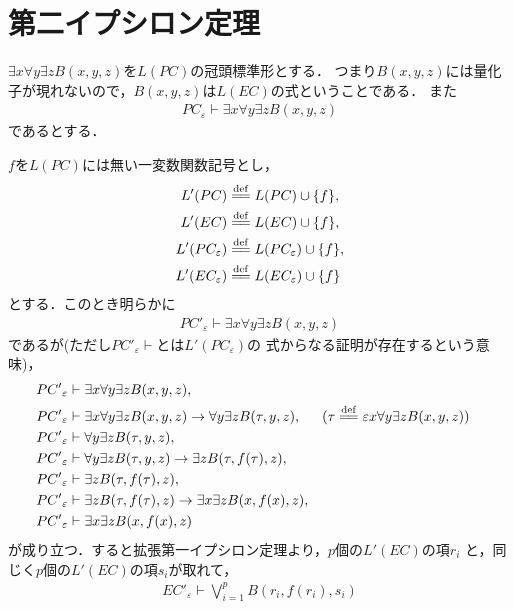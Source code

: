 \section{第二イプシロン定理}
	$\exists x \forall y \exists z B(x,y,z)$を$L(PC)$の冠頭標準形とする．
	つまり$B(x,y,z)$には量化子が現れないので，$B(x,y,z)$は$L(EC)$の式ということである．
	また
	\begin{align}
		PC_{\varepsilon} \vdash \exists x \forall y \exists z B(x,y,z)
	\end{align}
	であるとする．
	
	$f$を$L(PC)$には無い一変数関数記号とし，
	\begin{align}
		L'(PC) &\defeq L(PC) \cup \{f\}, \\
		L'(EC) &\defeq L(EC) \cup \{f\}, \\
		L'(PC_{\varepsilon}) &\defeq L(PC_{\varepsilon}) \cup \{f\}, \\
		L'(EC_{\varepsilon}) &\defeq L(EC_{\varepsilon}) \cup \{f\}
	\end{align}
	とする．このとき明らかに
	\begin{align}
		{PC'}_{\varepsilon} \vdash \exists x \forall y \exists z B(x,y,z)
	\end{align}
	であるが(ただし${PC'}_{\varepsilon} \vdash$とは$L'(PC_{\varepsilon})$の
	式からなる証明が存在するという意味)，
	\begin{align}
		{PC'}_{\varepsilon} &\vdash \exists x \forall y \exists z B(x,y,z), \\
		{PC'}_{\varepsilon} &\vdash \exists x \forall y \exists z B(x,y,z)
		\rightarrow \forall y \exists z B(\tau,y,z), && 
		(\tau \defeq \varepsilon x \forall y \exists z B(x,y,z)) \\
		{PC'}_{\varepsilon} &\vdash \forall y \exists z B(\tau,y,z), \\
		{PC'}_{\varepsilon} &\vdash \forall y \exists z B(\tau,y,z)
		\rightarrow \exists z B(\tau,f(\tau),z), \\
		{PC'}_{\varepsilon} &\vdash \exists z B(\tau,f(\tau),z), \\
		{PC'}_{\varepsilon} &\vdash \exists z B(\tau,f(\tau),z)
		\rightarrow \exists x \exists z B(x,f(x),z), \\
		{PC'}_{\varepsilon} &\vdash \exists x \exists z B(x,f(x),z)
	\end{align}
	が成り立つ．すると拡張第一イプシロン定理より，$p$個の$L'(EC)$の項$r_{i}$
	と，同じく$p$個の$L'(EC)$の項$s_{i}$が取れて，
	\begin{align}
		{EC'}_{\varepsilon} \vdash \bigvee_{i=1}^{p} B(r_{i},f(r_{i}),s_{i})
	\end{align}
